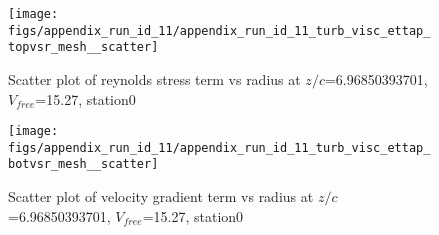 \begin{figure}[H]
\centering
\texttt{[image: figs/appendix\_run\_id\_11/appendix\_run\_id\_11\_turb\_visc\_ettap\_topvsr\_mesh\_\_scatter]}
\caption{Scatter plot of reynolds stress term vs radius at $z/c$=6.96850393701, $V_{free}$=15.27, station0}
\label{fig:appendix_run_id_11_turb_visc_ettap_topvsr_mesh__scatter}
\end{figure}


\begin{figure}[H]
\centering
\texttt{[image: figs/appendix\_run\_id\_11/appendix\_run\_id\_11\_turb\_visc\_ettap\_botvsr\_mesh\_\_scatter]}
\caption{Scatter plot of velocity gradient term vs radius at $z/c$=6.96850393701, $V_{free}$=15.27, station0}
\label{fig:appendix_run_id_11_turb_visc_ettap_botvsr_mesh__scatter}
\end{figure}


